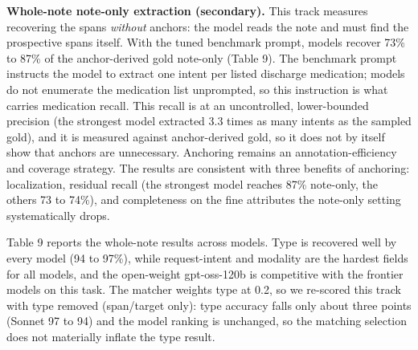 \documentclass[3p,twocolumn]{elsarticle}
\begin{document}
\textbf{Whole-note note-only extraction (secondary).} This track measures recovering the spans \emph{without} anchors: the model reads the note and must find the prospective spans itself. With the tuned benchmark prompt, models recover 73\% to 87\% of the anchor-derived gold note-only (Table 9). The benchmark prompt instructs the model to extract one intent per listed discharge medication; models do not enumerate the medication list unprompted, so this instruction is what carries medication recall. This recall is at an uncontrolled, lower-bounded precision (the strongest model extracted 3.3 times as many intents as the sampled gold), and it is measured against anchor-derived gold, so it does not by itself show that anchors are unnecessary. Anchoring remains an annotation-efficiency and coverage strategy. The results are consistent with three benefits of anchoring: localization, residual recall (the strongest model reaches 87\% note-only, the others 73 to 74\%), and completeness on the fine attributes the note-only setting systematically drops.

Table 9 reports the whole-note results across models. Type is recovered well by every model (94 to 97\%), while request-intent and modality are the hardest fields for all models, and the open-weight gpt-oss-120b is competitive with the frontier models on this task. The matcher weights type at 0.2, so we re-scored this track with type removed (span/target only): type accuracy falls only about three points (Sonnet 97 to 94) and the model ranking is unchanged, so the matching selection does not materially inflate the type result.
\end{document}
